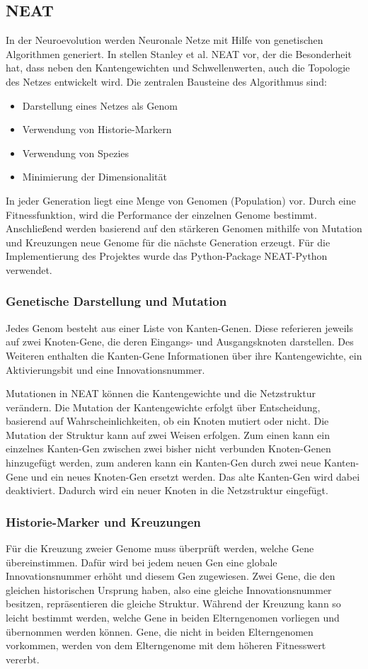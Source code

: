 \documentclass[11pt,final,journal,a4paper,towside,towcolumn]{IEEEtran}
\begin{document}
\subsection{NEAT}
In der Neuroevolution werden Neuronale Netze mit Hilfe von genetischen Algorithmen generiert. In \cite{stanley:gecco02-efficient} stellen Stanley et al. \ac{NEAT} vor, der die Besonderheit hat, dass neben den Kantengewichten und Schwellenwerten, auch die Topologie des Netzes entwickelt wird.
Die zentralen Bausteine des Algorithmus sind:
\begin{itemize}
\item Darstellung eines Netzes als Genom	
\item Verwendung von Historie-Markern
\item Verwendung von Spezies
\item Minimierung der Dimensionalität
\end{itemize}
In jeder Generation liegt eine Menge von Genomen (Population) vor. Durch eine Fitnessfunktion, wird die Performance der einzelnen Genome bestimmt. Anschließend werden basierend auf den stärkeren Genomen mithilfe von Mutation und Kreuzungen neue Genome für die nächste Generation erzeugt. 
Für die Implementierung des Projektes wurde das Python-Package NEAT-Python \cite{python-neat} verwendet.
\subsubsection{Genetische Darstellung und Mutation}
Jedes Genom besteht aus einer Liste von Kanten-Genen. Diese referieren jeweils auf zwei Knoten-Gene, die deren Eingangs- und Ausgangsknoten darstellen. Des Weiteren enthalten die Kanten-Gene Informationen über ihre Kantengewichte, ein Aktivierungsbit und eine Innovationsnummer. 

Mutationen in \ac{NEAT} können die Kantengewichte und die Netzstruktur verändern. Die Mutation der Kantengewichte erfolgt über Entscheidung, basierend auf Wahrscheinlichkeiten, ob ein Knoten mutiert oder nicht. Die Mutation der Struktur kann auf zwei Weisen erfolgen. Zum einen kann ein einzelnes Kanten-Gen zwischen zwei bisher nicht verbunden Knoten-Genen hinzugefügt werden, zum anderen kann ein Kanten-Gen durch zwei neue Kanten-Gene und ein neues Knoten-Gen ersetzt werden. Das alte Kanten-Gen wird dabei deaktiviert. Dadurch wird ein neuer Knoten in die Netzstruktur eingefügt.
\subsubsection{Historie-Marker und Kreuzungen}
Für die Kreuzung zweier Genome muss überprüft werden, welche Gene übereinstimmen. Dafür wird bei jedem neuen Gen eine globale Innovationsnummer erhöht und diesem Gen zugewiesen. Zwei Gene, die den gleichen historischen Ursprung haben, also eine gleiche Innovationsnummer besitzen, repräsentieren die gleiche Struktur. Während der Kreuzung kann so leicht bestimmt werden, welche Gene in beiden Elterngenomen vorliegen und übernommen werden können. Gene, die nicht in beiden Elterngenomen vorkommen, werden von dem Elterngenome mit dem höheren Fitnesswert vererbt.
\end{document}
